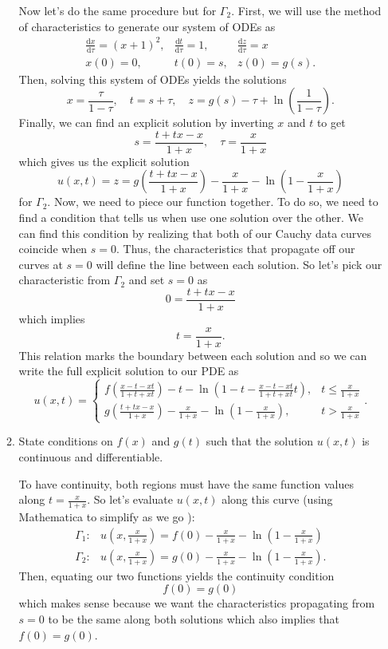 \documentclass[a4paper,12pt]{article}
\newcommand{\dd}{\mathrm{d}}
\begin{document}
\begin{enumerate}[label = \arabic*.]
\begin{enumerate}[label = (\alph*)]
				Now let's do the same procedure but for $ \Gamma_2 $. First, we will use the method of characteristics to generate our system of ODEs as
				\[
					\begin{array}{ccc}
						\frac{\dd x}{\dd \tau} = (x + 1)^2, & \frac{\dd t}{\dd \tau} = 1, & \frac{\dd z}{\dd \tau} = x \\
						x(0) = 0, & t(0) = s, & z(0) = g(s).
					\end{array}
				\]
				Then, solving this system of ODEs yields the solutions
				\[
					x = \frac{\tau}{1 - \tau}, \quad t = s + \tau, \quad z = g(s) - \tau + \ln\left(\frac{1}{1 - \tau}\right).
				\]
				Finally, we can find an explicit solution by inverting $ x $ and $ t $ to get
				\[
					s = \frac{t + tx - x}{1 + x}, \quad \tau = \frac{x}{1 + x}
				\]
				which gives us the explicit solution
				\[
					u(x,t) = z = g\left(\frac{t + tx - x}{1 + x}\right) - \frac{x}{1 + x} - \ln\left(1 - \frac{x}{1 + x}\right)
				\]
				for $ \Gamma_2 $. Now, we need to piece our function together. To do so, we need to find a condition that tells us when use one solution over the other. We can find this condition by realizing that both of our Cauchy data curves coincide when $ s = 0 $. Thus, the characteristics that propagate off our curves at $ s = 0 $ will define the line between each solution. So let's pick our characteristic from $ \Gamma_2 $ and set $ s = 0 $ as
				\[
					0 = \frac{t + t x - x}{1 + x}
				\]
				which implies
				\[
					t = \frac{x}{1 + x}.
				\]
				This relation marks the boundary between each solution and so we can write the full explicit solution to our PDE as 
				\[
					u(x,t) =
					\begin{cases}
						f\left(\frac{x - t - x t}{1 + t + x t}\right) - t - \ln\left(1 - t - \frac{x - t - x t}{1 + t + x t} t\right), & t \leq \frac{x}{1 + x} \\
						g\left(\frac{t + tx - x}{1 + x}\right) - \frac{x}{1 + x} - \ln\left(1 - \frac{x}{1 + x}\right), & t > \frac{x}{1 + x}
					\end{cases}.
				\]
				
				\item State conditions on $ f(x) $ and $ g(t) $ such that the solution $ u(x,t) $ is continuous and differentiable.
				
				To have continuity, both regions must have the same function values along $ t = \frac{x}{1 + x} $. So let's evaluate $ u(x,t) $ along this curve (using Mathematica to simplify as we go ):
				\begin{align*}
					\Gamma_1: & u\left(x,\frac{x}{1 + x}\right) = f(0) - \frac{x}{1 + x} - \ln\left(1 - \frac{x}{1 + x}\right) \\
					\Gamma_2: & u\left(x,\frac{x}{1 + x}\right) = g(0) - \frac{x}{1 + x} - \ln\left(1 - \frac{x}{1 + x}\right).
				\end{align*}
				Then, equating our two functions yields the continuity condition
				\[
					f(0) = g(0)
				\]
				which makes sense because we want the characteristics propagating from $ s = 0 $ to be the same along both solutions which also implies that $ f(0) = g(0) $.
				

\end{enumerate}
\end{enumerate}
\end{document}
